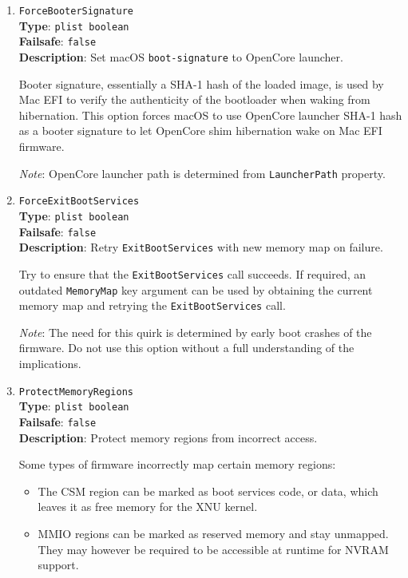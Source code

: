 \documentclass[]{article}
\providecommand{\tightlist}{%
  \setlength{\itemsep}{0pt}\setlength{\parskip}{0pt}}
\begin{document}
\begin{enumerate}
\item
  \texttt{ForceBooterSignature}\\
  \textbf{Type}: \texttt{plist\ boolean}\\
  \textbf{Failsafe}: \texttt{false}\\
  \textbf{Description}: Set macOS \texttt{boot-signature} to OpenCore launcher.

  Booter signature, essentially a SHA-1 hash of the loaded image, is used by Mac EFI
  to verify the authenticity of the bootloader when waking from hibernation. This
  option forces macOS to use OpenCore launcher SHA-1 hash as a booter signature to let
  OpenCore shim hibernation wake on Mac EFI firmware.

  \emph{Note}: OpenCore launcher path is determined from \texttt{LauncherPath} property.

\item
  \texttt{ForceExitBootServices}\\
  \textbf{Type}: \texttt{plist\ boolean}\\
  \textbf{Failsafe}: \texttt{false}\\
  \textbf{Description}: Retry \texttt{ExitBootServices} with new memory map on failure.

  Try to ensure that the \texttt{ExitBootServices} call succeeds. If required, an
  outdated \texttt{MemoryMap} key argument can be used by obtaining the current
  memory map and retrying the \texttt{ExitBootServices} call.

  \emph{Note}: The need for this quirk is determined by early boot crashes of the
  firmware. Do not use this option without a full understanding of the implications.

\item
  \texttt{ProtectMemoryRegions}\\
  \textbf{Type}: \texttt{plist\ boolean}\\
  \textbf{Failsafe}: \texttt{false}\\
  \textbf{Description}: Protect memory regions from incorrect access.

  Some types of firmware incorrectly map certain memory regions:

  \begin{itemize}
    \tightlist
    \item The CSM region can be marked as boot services code, or data, which
      leaves it as free memory for the XNU kernel.
    \item MMIO regions can be marked as reserved memory and stay unmapped.
      They may however be required to be accessible at runtime for NVRAM support.
  \end{itemize}


\end{enumerate}
\end{document}
